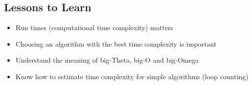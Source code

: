 
\begin{slide}
\section{Lessons to Learn}

\begin{PauseHighLight}
  \begin{itemize}
  \item Run times (computational time complexity) matters\pause
  \item Choosing an algorithm with the best time complexity is
    important\pause
  \item Understand the meaning of big-Theta, big-O and big-Omega\pause
  \item Know how to estimate time complexity for simple algorithms (loop
    counting)\pause
  \end{itemize}
\end{PauseHighLight}
\end{slide}
